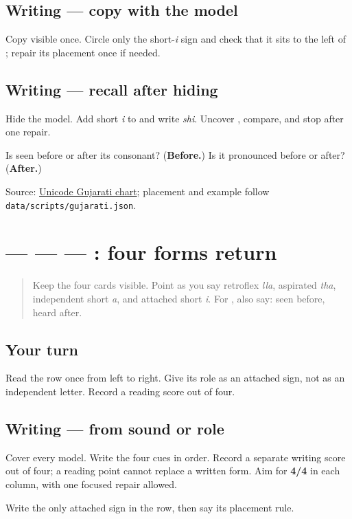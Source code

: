 \subsection*{Writing — copy with the model}
Copy visible \textbf{} once. Circle only the short-\emph{i} sign and check that it sits to the left of \textbf{}; repair its placement once if needed.

\subsection*{Writing — recall after hiding}
Hide the model. Add short \emph{i} to \textbf{} and write \emph{shi}. Uncover \textbf{}, compare, and stop after one repair.

\begin{tcolorbox}[breakable,colback=teal!4,colframe=teal!35!black,title={Before you move on}]
Is \textbf{} seen before or after its consonant? (\textbf{Before.}) Is it pronounced before or after? (\textbf{After.})

Source: \href{https://www.unicode.org/charts/PDF/U0A80.pdf}{Unicode Gujarati chart}; placement and example follow \texttt{data/scripts/gujarati.json}.
\end{tcolorbox}
\section[\texorpdfstring{\gu{ળ} — \gu{થ} — \gu{અ} — \gu{િ} (retroflex lla …)}{ળ — થ — અ — િ (retroflex lla …)}]{ —  —  — : four forms return}

\label{lesson:GU-R04-first-four-r1}



\begin{quote}
Keep the four cards visible. Point as you say retroflex \emph{lla}, aspirated \emph{tha}, independent short \emph{a}, and attached short \emph{i}. For \textbf{}, also say: seen before, heard after.
\end{quote}

\subsection*{Your turn}
Read the row once from left to right. Give \textbf{} its role as an attached sign, not as an independent letter. Record a reading score out of four.

\subsection*{Writing — from sound or role}
Cover every model. Write the four cues in order. Record a separate writing score out of four; a reading point cannot replace a written form. Aim for \textbf{4/4} in each column, with one focused repair allowed.

\begin{tcolorbox}[breakable,colback=teal!4,colframe=teal!35!black,title={Before you move on}]
Write the only attached sign in the row, then say its placement rule.
\end{tcolorbox}
